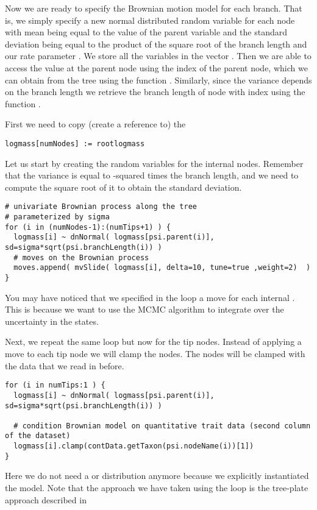 Now we are ready to specify the Brownian motion model for each branch.
That is, we simply specify a new normal distributed random variable for each node with mean being equal to the value of the parent variable and the standard deviation being equal to the product of the square root of the branch length and our rate parameter . We store all the variables in the vector . Then we are able to access the value at the parent node using the index of the parent node, which we can obtain from the tree using the function . Similarly, since the variance depends on the branch length we retrieve the branch length of node with index  using the function .

First we need to copy (create a reference to) the 
{\tt \small \begin{snugshade*}
\begin{lstlisting}
logmass[numNodes] := rootlogmass
\end{lstlisting}
\end{snugshade*}}
Let us start by creating the random variables for the internal nodes. Remember that the variance is equal to -squared times the branch length, and we need to compute the square root of it to obtain the standard deviation.
{\tt \small \begin{snugshade*}
\begin{lstlisting}
# univariate Brownian process along the tree
# parameterized by sigma
for (i in (numNodes-1):(numTips+1) ) {
  logmass[i] ~ dnNormal( logmass[psi.parent(i)], sd=sigma*sqrt(psi.branchLength(i)) )
  # moves on the Brownian process
  moves.append( mvSlide( logmass[i], delta=10, tune=true ,weight=2)  )
}
\end{lstlisting}
\end{snugshade*}}
You may have noticed that we specified in the loop a move for each internal . This is because we want to use the MCMC algorithm to integrate over the uncertainty in the states.

Next, we repeat the same loop but now for the tip nodes. Instead of applying a move to each tip node we will clamp the nodes. The nodes will be clamped with the data that we read in before.
{\tt \small \begin{snugshade*}
\begin{lstlisting}
for (i in numTips:1 ) {
  logmass[i] ~ dnNormal( logmass[psi.parent(i)], sd=sigma*sqrt(psi.branchLength(i)) )

  # condition Brownian model on quantitative trait data (second column of the dataset)
  logmass[i].clamp(contData.getTaxon(psi.nodeName(i))[1])
}
\end{lstlisting}
\end{snugshade*}}
Here we do not need a  or  distribution anymore because we explicitly instantiated the model. Note that the approach we have taken using the loop is the tree-plate approach described in \citep{Hohna2014b}

